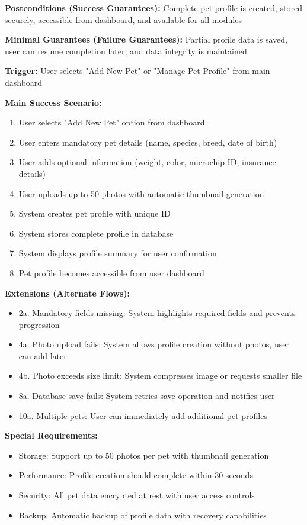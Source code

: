 \textbf{Postconditions (Success Guarantees):} Complete pet profile is created, stored securely, accessible from dashboard, and available for all modules

\textbf{Minimal Guarantees (Failure Guarantees):} Partial profile data is saved, user can resume completion later, and data integrity is maintained

\textbf{Trigger:} User selects "Add New Pet" or "Manage Pet Profile" from main dashboard

\textbf{Main Success Scenario:}
\begin{enumerate}
    \item User selects "Add New Pet" option from dashboard
    \item User enters mandatory pet details (name, species, breed, date of birth)
    \item User adds optional information (weight, color, microchip ID, insurance details)
    \item User uploads up to 50 photos with automatic thumbnail generation
    \item System creates pet profile with unique ID
    \item System stores complete profile in database
    \item System displays profile summary for user confirmation
    \item Pet profile becomes accessible from user dashboard
\end{enumerate}

\textbf{Extensions (Alternate Flows):}
\begin{itemize}
    \item 2a. Mandatory fields missing: System highlights required fields and prevents progression
    \item 4a. Photo upload fails: System allows profile creation without photos, user can add later
    \item 4b. Photo exceeds size limit: System compresses image or requests smaller file
    \item 8a. Database save fails: System retries save operation and notifies user
    \item 10a. Multiple pets: User can immediately add additional pet profiles
\end{itemize}

\textbf{Special Requirements:}
\begin{itemize}
    \item Storage: Support up to 50 photos per pet with thumbnail generation
    \item Performance: Profile creation should complete within 30 seconds
    \item Security: All pet data encrypted at rest with user access controls
    \item Backup: Automatic backup of profile data with recovery capabilities
\end{itemize}

